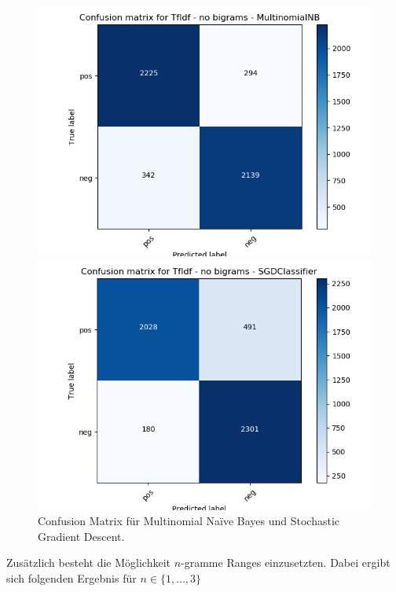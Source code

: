 \documentclass[12pt]{scrartcl}
\begin{document}
    \begin{figure}[h]
    	\begin{minipage}{0.45\textwidth}
    		\includegraphics[scale=.35]{pictures/tfidf_nb_mnb.png}
    	\end{minipage}
    	\hfill
    	\begin{minipage}{0.45\textwidth}
    		\includegraphics[scale=.35]{pictures/tfidf_nb_sgd.png}
    	\end{minipage}
    	\caption{Confusion Matrix für Multinomial Naïve Bayes und Stochastic Gradient Descent.}
    \end{figure}

    Zusätzlich besteht die Möglichkeit $n$-gramme Ranges einzusetzten.
    Dabei ergibt sich folgenden Ergebnis für $n \in \{1,\dots, 3\}$
\end{document}
